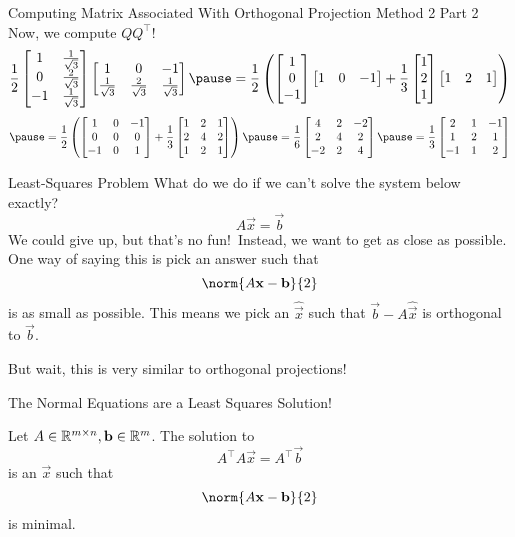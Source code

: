 \documentclass[xcoler=dvipsnames, aspectratio=169]{beamer}
\begin{document}
    \begin{frame}{Computing Matrix Associated With Orthogonal Projection Method 2 Part 2}
        \footnotesize
        Now, we compute $QQ^\top$!
        \[
            \frac{1}{2}\bMat{
                1 & \frac{1}{\sqrt{3}}\\
                0 & \frac{2}{\sqrt{3}}\\
                -1& \frac{1}{\sqrt{3}}
            }\bMat{
                1 & 0 & -1\\
                \frac{1}{\sqrt{3}} & \frac{2}{\sqrt{3}} & \frac{1}{\sqrt{3}}
            }\pause = \frac{1}{2}\left(\bMat{1\\0\\-1}\bMat{1&0&-1} + \frac{1}{3}\bMat{1\\2\\1}\bMat{1&2&1}\right)
        \]
        \[
            \pause = \frac{1}{2}\left(\bMat{
                1 & 0 & -1\\
                0 & 0 & 0\\
                -1 &0 & 1
            } + \frac{1}{3}\bMat{
                1 & 2 & 1\\
                2 & 4 & 2\\
                1 & 2 & 1
            }\right)\pause = \frac{1}{6}\bMat{
                4 & 2 & -2\\
                2 & 4 & 2\\
                -2 & 2 & 4
            }\pause = \frac{1}{3}\bMat{
                2 & 1 & -1\\
                1 & 2 & 1\\
                -1 & 1 & 2
            }
        \]
    \end{frame}
    \begin{frame}{Least-Squares Problem}
        What do we do if we can't solve the system below exactly?
        \[
            A\vec{x} = \vec{b}
        \]\pause
        We could give up, but that's no fun!\pause\ Instead, we want to get as close as possible. One 
        way of saying this is pick an answer such that
        \[
            \norm{A\vec{x}-\vec{b}}{2}
        \]
        is as small as possible. This means we pick an $\hat{\vec{x}}$ such that $\vec{b} - A\hat{\vec{x}}$
        is orthogonal to $\vec{b}$.\pause

        But wait, this is very similar to orthogonal projections!
    \end{frame}
    \begin{frame}{The Normal Equations are a Least Squares Solution!}
        \begin{theorem}
            Let $A\in\mathbb{R}^{m\times n}, \mathbf{b}\in\mathbb{R}^m$. The solution to
            \[
                A^\top A\vec{x} = A^\top\vec{b}
            \]
            is an $\vec{x}$ such that
            \[
                \norm{A\vec{x}-\vec{b}}{2}
            \]
            is minimal.
        \end{theorem}
    \end{frame}
\end{document}
